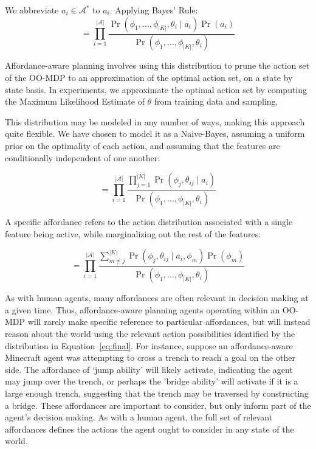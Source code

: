 \documentclass[conference]{IEEEtran}
\begin{document}
We abbreviate $a_i \in \mathcal{A}^*$ to $a_i$. Applying Bayes' Rule:
\begin{equation}
= \prod_{i=1}^{|\mathcal{A}|} \frac{\Pr(\phi_1, \ldots, \phi_{|K|}, \theta_i \mid a_i) \Pr(a_i)}{\Pr(\phi_1, \ldots, \phi_{|K|}, \theta_i)}
\label{eq:bayes}
\end{equation}

Affordance-aware planning involves using this distribution to prune the action set of the OO-MDP
to an approximation of the optimal action set, on a state by state basis. In experiments, we approximate
the optimal action set by computing the Maximum Likelihood Estimate of $\theta$ from training data and sampling.

This distribution may be modeled in any number of ways, making this approach quite flexible.
We have chosen to model it as a Naive-Bayes, assuming a uniform prior on the optimality of each action,
and assuming that the features are conditionally independent of one another:

\begin{equation}
= \prod_{i=1}^{|\mathcal{A}|} \frac{\prod_{j=1}^{|K|} \Pr(\phi_j, \theta_{ij} \mid a_i) }{\Pr(\phi_1, \ldots, \phi_{|K|}, \theta_i)}
\label{eq:final}
\end{equation}

A specific affordance refers to the action distribution associated with a single feature being active, while marginalizing out the rest of the features:

\begin{equation}
= \prod_{i=1}^{|\mathcal{A}|} \frac{\sum_{m\not=j}^{|K|} \Pr(\phi_j, \theta_{ij} \mid a_i, \phi_m) \Pr(\phi_m)}{\Pr(\phi_1, \ldots, \phi_{|K|}, \theta_i)}
\label{eq:posterior}
\end{equation}

As with human agents, many affordances are often relevant in decision making at a given time.
Thus, affordance-aware planning agents operating within an OO-MDP will rarely make specific
reference to particular affordances, but will instead reason about the world using the relevant
action possibilities identified by the distribution in Equation~\ref{eq:final}. For instance, suppose
an affordance-aware Minecraft agent was attempting to cross a trench to reach a goal on the 
other side. The affordance of `jump ability' will likely activate, indicating the agent may jump over the trench,
or perhaps the 'bridge ability' will activate if it is a large enough trench, suggesting that the trench
may be traversed by constructing a bridge. These affordances are important to consider, but only inform part of the agent's decision making. As with a human agent, the full set of relevant affordances defines the actions 
the agent ought to consider in any state of the world.
\end{document}

